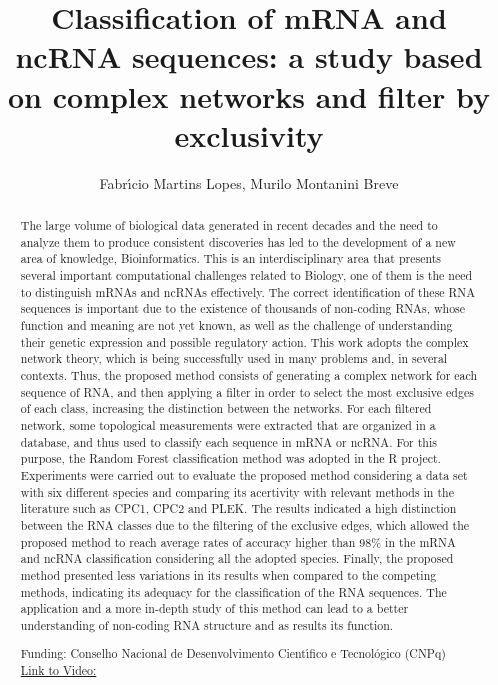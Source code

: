 \documentclass[twoside]{article}
\title{\vspace{-15mm}\fontsize{24pt}{10pt}\selectfont\textbf{ Classification of mRNA and ncRNA sequences: a study based on complex networks and filter by exclusivity }} %
\author{ Fabr\'{\i}cio Martins Lopes,  Murilo Montanini Breve }
\affil{ UNIVERSIDADE TECNOL\'OGICA FEDERAL DO PARAN\'A,  Universidade Tecnol\'ogica Federal do Paran\'a (UTFPR) }
\date{}
\begin{document}
  
  
  \maketitle %
  
  
  \thispagestyle{fancy} %
  
  
  \begin{abstract}
  The large volume of biological data generated in recent decades and the need to analyze them to produce consistent discoveries has led to the development of a new area of knowledge,  Bioinformatics. This is an interdisciplinary area that presents several important computational challenges related to Biology,  one of them is the need to distinguish mRNAs and ncRNAs effectively. The correct identification of these RNA sequences is important due to the existence of thousands of non-coding RNAs,  whose function and meaning are not yet known,  as well as the challenge of understanding their genetic expression and possible regulatory action. This work adopts the complex network theory,  which is being successfully used in many problems and,  in several contexts. Thus,  the proposed method consists of generating a complex network for each sequence of RNA,  and then applying a filter in order to select the most exclusive edges of each class,  increasing the distinction between the networks. For each filtered network,  some topological measurements were extracted that are organized in a database,  and thus used to classify each sequence in mRNA or ncRNA. For this purpose,  the Random Forest classification method was adopted in the R project. Experiments were carried out to evaluate the proposed method considering a data set with six different species and comparing its acertivity with relevant methods in the literature such as CPC1,  CPC2 and PLEK. The results indicated a high distinction between the RNA classes due to the filtering of the exclusive edges,  which allowed the proposed method to reach average rates of accuracy higher than 98\% in the mRNA and ncRNA classification considering all the adopted species. Finally,  the proposed method presented less variations in its results when compared to the competing methods,  indicating its adequacy for the classification of the RNA sequences. The application and a more in-depth study of this method can lead to a better understanding of non-coding RNA structure and as results its function.
  
  Funding: Conselho Nacional de Desenvolvimento Cient\'{\i}fico e Tecnol\'ogico (CNPq) \\
  \href{http://ab3c.org.br/xpress_pres2020/xmxp2020-303012.html}{Link to Video:}

  \end{abstract}
   
  
\end{document}
